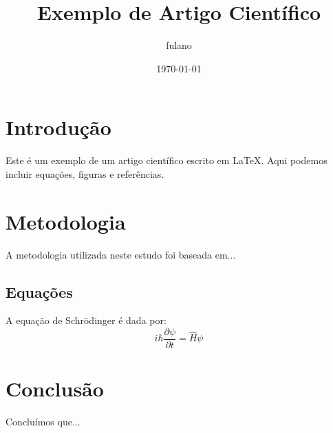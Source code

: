 \documentclass{article}
\title{Exemplo de Artigo Científico}
\author{fulano}
\date{\today}
\begin{document}
	
	\maketitle
	
	\section{Introdução}
	Este é um exemplo de um artigo científico escrito em LaTeX. Aqui podemos incluir equações, figuras e referências.
	
	\section{Metodologia}
	A metodologia utilizada neste estudo foi baseada em...
	
	\subsection{Equações}
	A equação de Schrödinger é dada por:
	\[
	i\hbar \frac{\partial \psi}{\partial t} = \hat{H} \psi
	\]


	\section{Conclusão}
	Concluímos que...
	
\end{document}
